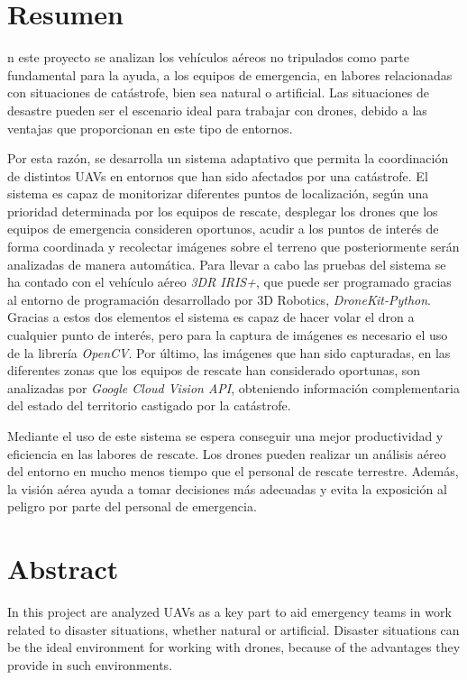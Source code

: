 \chapter{Resumen}

n este proyecto se analizan los vehículos aéreos no tripulados como parte fundamental para la ayuda, a los equipos de emergencia, en labores relacionadas con situaciones de catástrofe, bien sea natural o artificial. Las situaciones de desastre pueden ser el escenario ideal para trabajar con drones, debido a las ventajas que proporcionan en este tipo de entornos.

Por esta razón, se desarrolla un sistema adaptativo que permita la coordinación de distintos \acs{UAV}s en entornos que han sido afectados por una catástrofe. El sistema es capaz de monitorizar diferentes puntos de localización, según una prioridad determinada por los equipos de rescate, desplegar los drones que los equipos de emergencia consideren oportunos, acudir a los puntos de interés de forma coordinada y recolectar imágenes sobre el terreno que posteriormente serán analizadas de manera automática. Para llevar a cabo las pruebas del sistema se ha contado con el vehículo aéreo \textit{3DR IRIS+}, que puede ser programado gracias al entorno de programación desarrollado por 3D Robotics, \textit{DroneKit-Python}. Gracias a estos dos elementos el sistema es capaz de hacer volar el dron a cualquier punto de interés, pero para la captura de imágenes es necesario el uso de la librería \textit{OpenCV}. Por último, las imágenes que han sido capturadas, en las diferentes zonas que los equipos de rescate han considerado oportunas, son analizadas por \textit{Google Cloud Vision \acs{API}}, obteniendo información complementaria del estado del territorio castigado por la catástrofe.

Mediante el uso de este sistema se espera conseguir una mejor productividad y eficiencia en las labores de rescate. Los drones pueden realizar un análisis aéreo del entorno en mucho menos tiempo que el personal de rescate terrestre. Además, la visión aérea ayuda a tomar decisiones más adecuadas y evita la exposición al peligro por parte del personal de emergencia.

\chapter{Abstract}

In this project are analyzed \acs{UAV}s as a key part to aid emergency teams in work related to disaster situations, whether natural or artificial. Disaster situations can be the ideal environment for working with drones, because of the advantages they provide in such environments.

